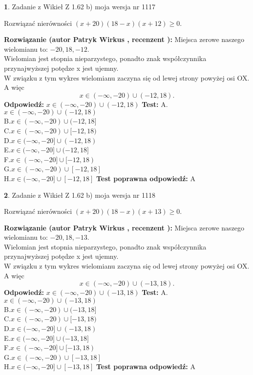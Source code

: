 \documentclass[12pt, a4paper]{article}
\theoremstyle{definition} %
\newtheorem{zad}{}
\newcommand{\zadStart}[1]{\begin{zad}#1\newline}
\newcommand{\zadStop}{\end{zad}}
\newcommand{\rozwStart}[2]{\noindent \textbf{Rozwiązanie (autor #1 , recenzent #2): }\newline}
\newcommand{\rozwStop}{\newline}
\newcommand{\odpStart}{\noindent \textbf{Odpowiedź:}\newline}
\newcommand{\odpStop}{\newline}
\newcommand{\testStart}{\noindent \textbf{Test:}\newline}
\newcommand{\testStop}{\newline}
\newcommand{\kluczStart}{\noindent \textbf{Test poprawna odpowiedź:}\newline}
\newcommand{\kluczStop}{\newline}
\begin{document}
\zadStart{Zadanie z Wikieł Z 1.62 b) moja wersja nr 1117}

Rozwiązać nierówności $(x+20)(18-x)(x+12)\ge0$.
\zadStop
\rozwStart{Patryk Wirkus}{}
Miejsca zerowe naszego wielomianu to: $-20, 18, -12$.\\
Wielomian jest stopnia nieparzystego, ponadto znak współczynnika przy\linebreak najwyższej potędze x jest ujemny.\\ W związku z tym wykres wielomianu zaczyna się od lewej strony powyżej osi OX. A więc $$x \in (-\infty,-20) \cup (-12,18).$$
\rozwStop
\odpStart
$x \in (-\infty,-20) \cup (-12,18)$
\odpStop
\testStart
A.$x \in (-\infty,-20) \cup (-12,18)$\\
B.$x \in (-\infty,-20) \cup (-12,18]$\\
C.$x \in (-\infty,-20) \cup [-12,18)$\\
D.$x \in (-\infty,-20] \cup (-12,18)$\\
E.$x \in (-\infty,-20] \cup (-12,18]$\\
F.$x \in (-\infty,-20] \cup [-12,18)$\\
G.$x \in (-\infty,-20) \cup [-12,18]$\\
H.$x \in (-\infty,-20] \cup [-12,18]$
\testStop
\kluczStart
A
\kluczStop



\zadStart{Zadanie z Wikieł Z 1.62 b) moja wersja nr 1118}

Rozwiązać nierówności $(x+20)(18-x)(x+13)\ge0$.
\zadStop
\rozwStart{Patryk Wirkus}{}
Miejsca zerowe naszego wielomianu to: $-20, 18, -13$.\\
Wielomian jest stopnia nieparzystego, ponadto znak współczynnika przy\linebreak najwyższej potędze x jest ujemny.\\ W związku z tym wykres wielomianu zaczyna się od lewej strony powyżej osi OX. A więc $$x \in (-\infty,-20) \cup (-13,18).$$
\rozwStop
\odpStart
$x \in (-\infty,-20) \cup (-13,18)$
\odpStop
\testStart
A.$x \in (-\infty,-20) \cup (-13,18)$\\
B.$x \in (-\infty,-20) \cup (-13,18]$\\
C.$x \in (-\infty,-20) \cup [-13,18)$\\
D.$x \in (-\infty,-20] \cup (-13,18)$\\
E.$x \in (-\infty,-20] \cup (-13,18]$\\
F.$x \in (-\infty,-20] \cup [-13,18)$\\
G.$x \in (-\infty,-20) \cup [-13,18]$\\
H.$x \in (-\infty,-20] \cup [-13,18]$
\testStop
\kluczStart
A
\kluczStop
\end{document}
